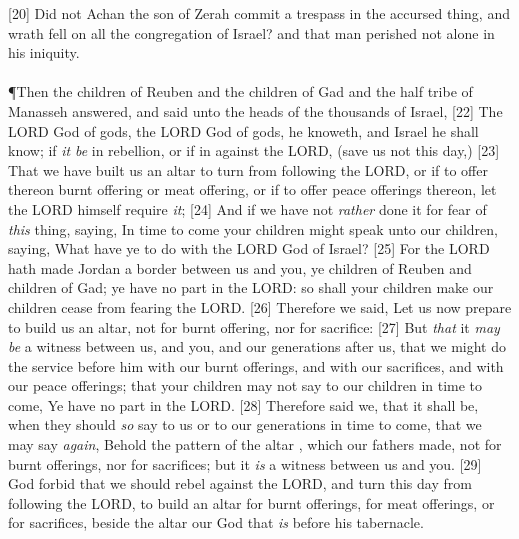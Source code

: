 [20] \textcolor[cmyk]{0.99998,1,0,0}{Did not Achan the son of Zerah commit a trespass in the accursed thing, and wrath fell on all the congregation of Israel? and that man perished not alone in his iniquity.}\\
\\
\P \textcolor[cmyk]{0.99998,1,0,0}{Then the children of Reuben and the children of Gad and the half tribe of Manasseh answered, and said unto the heads of the thousands of Israel,}
[22] \textcolor[cmyk]{0.99998,1,0,0}{The LORD God of gods, the LORD God of gods, he knoweth, and Israel he shall know; if \emph{it} \emph{be} in rebellion, or if in  against the LORD, (save us not this day,)}
[23] \textcolor[cmyk]{0.99998,1,0,0}{That we have built us an altar to turn from following the LORD, or if to offer thereon burnt offering or meat offering, or if to offer peace offerings thereon, let the LORD himself require \emph{it};}
[24] \textcolor[cmyk]{0.99998,1,0,0}{And if we have not \emph{rather} done it for fear of \emph{this} thing, saying, In time to come your children might speak unto our children, saying, What have ye to do with the LORD God of Israel?}
[25] \textcolor[cmyk]{0.99998,1,0,0}{For the LORD hath made Jordan a border between us and you, ye children of Reuben and children of Gad; ye have no part in the LORD: so shall your children make our children cease from fearing the LORD.}
[26] \textcolor[cmyk]{0.99998,1,0,0}{Therefore we said, Let us now prepare to build us an altar, not for burnt offering, nor for sacrifice:}
[27] \textcolor[cmyk]{0.99998,1,0,0}{But \emph{that} it \emph{may} \emph{be} a witness between us, and you, and our generations after us, that we might do the service  before him with our burnt offerings, and with our sacrifices, and with our peace offerings; that your children may not say to our children in time to come, Ye have no part in the LORD.}
[28] \textcolor[cmyk]{0.99998,1,0,0}{Therefore said we, that it shall be, when they should \emph{so} say to us or to our generations in time to come, that we may say \emph{again}, Behold the pattern of the altar , which our fathers made, not for burnt offerings, nor for sacrifices; but it \emph{is} a witness between us and you.}
[29] \textcolor[cmyk]{0.99998,1,0,0}{God forbid that we should rebel against the LORD, and turn this day from following the LORD, to build an altar for burnt offerings, for meat offerings, or for sacrifices, beside the altar  our God that \emph{is} before his tabernacle.}\\
